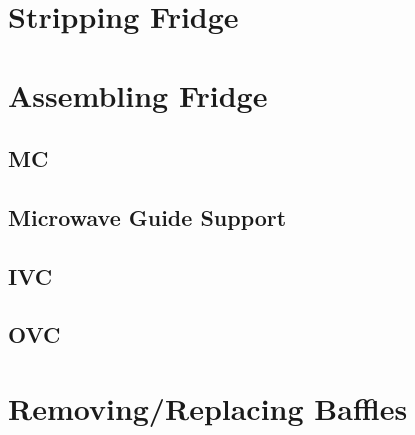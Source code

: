 \section{Stripping Fridge}

\section{Assembling Fridge}

  \subsection{MC}
  \subsection{Microwave Guide Support}
  \subsection{IVC}
  \subsection{OVC}

\section{Removing/Replacing \het{} Baffles}